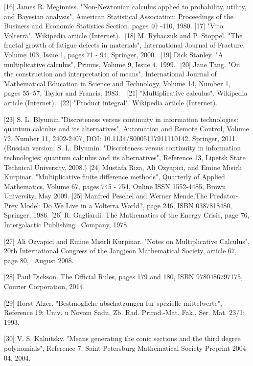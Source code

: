 \documentclass[12pt]{article}
\begin{document}
[16] James R. Meginniss. "Non-Newtonian calculus applied to probability, utility, and Bayesian analysis", American Statistical Association: Proceedings of the Business and Economic Statistics Section, pages 40 -410, 1980.
[17] "Vito Volterra". Wikipedia article (Internet).  [18] M. Rybaczuk and P. Stoppel. "The fractal growth of fatigue defects in materials", International Journal of Fracture, Volume 103, Issue 1, pages 71 - 94, Springer, 2000.  [19] Dick Stanley. "A multiplicative calculus", Primus, Volume 9, Issue 4, 1999.  [20] Jane Tang. "On the construction and interpretation of means", International Journal of Mathematical Education in Science and Technology, Volume 14, Number 1,  pages 55–57, Taylor and Francis, 1983.   [21] "Multiplicative calculus". Wikipedia article (Internet).  [22] "Product integral". Wikipedia article (Internet).

[23] S. L. Blyumin."Discreteness versus continuity in information technologies: quantum calculus and its alternatives", Automation and Remote Control, Volume 72, Number 11, 2402-2407, DOI: 10.1134/S0005117911110142, Springer, 2011. (Russian version: S. L. Blyumin. "Discreteness versus continuity in information technologies: quantum calculus and its alternatives", Reference 13, Lipetsk State Technical University, 2008.)
[24] Mustafa Riza, Ali Ozyapici, and Emine Misirli Kurpinar. "Multiplicative finite difference methods", Quarterly of Applied Mathematics, Volume 67, pages 745 - 754, Online ISSN 1552-4485, Brown University, May 2009.
[25] Manfred Peschel and Werner Mende.The Predator-Prey Model: Do We Live in a Volterra World?, page 246, ISBN 0387818480, Springer, 1986. 
[26] R. Gagliardi. The Mathematics of the Energy Crisis, page 76, Intergalactic Publishing  Company, 1978.

[27] Ali Ozyapici and Emine Misirli Kurpinar. "Notes on Multiplicative Calculus", 20th International Congress of the Jangjeon Mathematical Society, article 67, page 80,  August 2008.

[28] Paul Dickson. The Official Rules, pages 179 and 180, ISBN 9780486797175, Courier Corporation, 2014.

[29] Horst Alzer. "Bestmogliche abschatzungen fur spezielle mittelwerte", Reference 19; Univ. u Novom Sadu, Zb. Rad. Prirod.-Mat. Fak., Ser. Mat. 23/1; 1993.

[30] V. S. Kalnitsky. "Means generating the conic sections and the third degree polynomials", Reference 7, Saint Petersburg Mathematical Society Preprint 2004-04, 2004.
\end{document}
